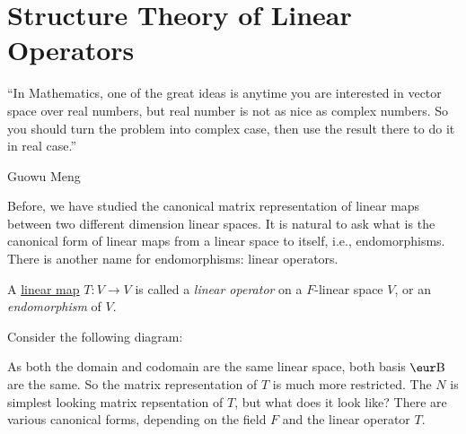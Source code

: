 \chapter{Structure Theory of Linear Operators}

\epigraph{``In Mathematics, one of the great ideas is anytime you are interested in vector space over real numbers, but real number is not as nice as complex numbers. So you should turn the problem into complex case, then use the result there to do it in real case.''}{Guowu Meng}

Before, we have studied the canonical matrix representation of linear maps between two different dimension linear spaces. It is natural to ask what is the canonical form of linear maps from a linear space to itself, i.e., endomorphisms. There is another name for endomorphisms: linear operators.

\begin{definition}\label{def:linear_operator}
  A \hyperref[def:linear_map]{linear map} $T : V \to V$ is called a \emph{linear operator} on a $F$-linear space $V$, or an \emph{endomorphism} of $V$.
\end{definition}

Consider the following diagram:
\begin{center}
\end{center}
As both the domain and codomain are the same linear space, both basis $\B$ are the same. So the matrix representation of $T$ is much more restricted. The $N$ is simplest looking matrix repsentation of $T$, but what does it look like? There are various canonical forms, depending on the field $F$ and the linear operator $T$.

